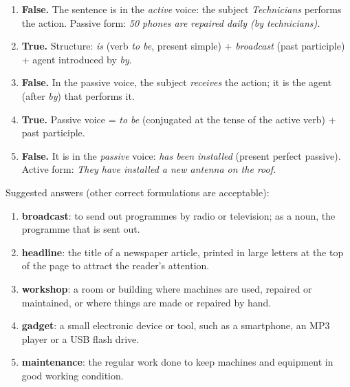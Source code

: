 \documentclass[11pt]{article}
\begin{document}
\begin{corrige}
\begin{enumerate}
\item \textbf{False.} The sentence is in the \emph{active} voice: the subject \emph{Technicians} performs the action. Passive form: \emph{50 phones are repaired daily (by technicians).}
\item \textbf{True.} Structure: \emph{is} (verb \emph{to be}, present simple) + \emph{broadcast} (past participle) + agent introduced by \emph{by}.
\item \textbf{False.} In the passive voice, the subject \emph{receives} the action; it is the agent (after \emph{by}) that performs it.
\item \textbf{True.} Passive voice = \emph{to be} (conjugated at the tense of the active verb) + past participle.
\item \textbf{False.} It is in the \emph{passive} voice: \emph{has been installed} (present perfect passive). Active form: \emph{They have installed a new antenna on the roof.}
\end{enumerate}
\end{corrige}

\begin{corrige}
Suggested answers (other correct formulations are acceptable):
\begin{enumerate}
\item \textbf{broadcast}: to send out programmes by radio or television; as a noun, the programme that is sent out.
\item \textbf{headline}: the title of a newspaper article, printed in large letters at the top of the page to attract the reader's attention.
\item \textbf{workshop}: a room or building where machines are used, repaired or maintained, or where things are made or repaired by hand.
\item \textbf{gadget}: a small electronic device or tool, such as a smartphone, an MP3 player or a USB flash drive.
\item \textbf{maintenance}: the regular work done to keep machines and equipment in good working condition.
\end{enumerate}
\end{corrige}
\end{document}
